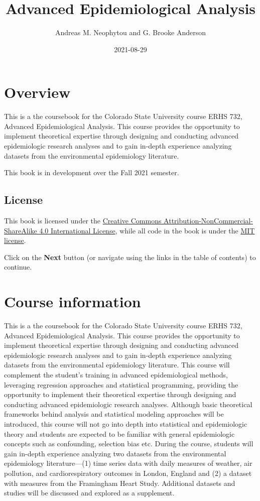 \documentclass[
]{book}
\title{Advanced Epidemiological Analysis}
\author{Andreas M. Neophytou and G. Brooke Anderson}
\date{2021-08-29}
\begin{document}
\maketitle

{
\setcounter{tocdepth}{1}
\tableofcontents
}
\hypertarget{overview}{%
\chapter{Overview}\label{overview}}

This is a the coursebook for the Colorado State University course ERHS 732,
Advanced Epidemiological Analysis. This course provides the opportunity to
implement theoretical expertise through designing and conducting advanced
epidemiologic research analyses and to gain in-depth experience analyzing
datasets from the environmental epidemiology literature.

This book is in development over the Fall 2021 semester.

\hypertarget{license}{%
\section{License}\label{license}}

This book is licensed under the \href{https://creativecommons.org/licenses/by-nc-sa/4.0/}{Creative Commons
Attribution-NonCommercial-ShareAlike 4.0 International
License}, while all code in
the book is under the \href{https://opensource.org/licenses/MIT}{MIT license}.

Click on the \textbf{Next} button (or navigate using the links in the table of
contents) to continue.

\hypertarget{courseinfo}{%
\chapter{Course information}\label{courseinfo}}

This is a the coursebook for the Colorado State University course ERHS 732,
Advanced Epidemiological Analysis. This course provides the opportunity to
implement theoretical expertise through designing and conducting advanced
epidemiologic research analyses and to gain in-depth experience analyzing
datasets from the environmental epidemiology literature. This course will
complement the student's training in advanced epidemiological methods,
leveraging regression approaches and statistical programming, providing the
opportunity to implement their theoretical expertise through designing and
conducting advanced epidemiologic research analyses. Although basic theoretical frameworks behind analysis and statistical modeling approaches will be introduced, this course will not go into depth into statistical and epidemiologic theory and students are expected to be familiar with general epidemiologic concepts such as confounding, selection bias etc. During the course,
students will gain in-depth experience analyzing two datasets from the
environmental epidemiology literature---(1) time series data with daily measures
of weather, air pollution, and cardiorespiratory outcomes in London, England and
(2) a dataset with measures from the Framingham Heart Study. Additional datasets
and studies will be discussed and explored as a supplement.
\end{document}
